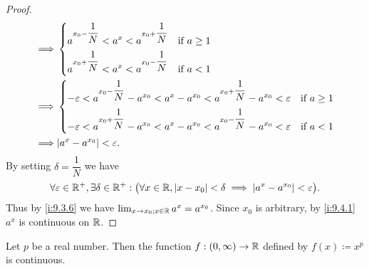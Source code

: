 \begin{proof}
\begin{align*}
    \implies & \begin{dcases}
                 a^{x_0 - \dfrac{1}{N}} < a^{x} < a^{x_0 + \dfrac{1}{N}} & \text{if } a \geq 1 \\
                 a^{x_0 + \dfrac{1}{N}} < a^{x} < a^{x_0 - \dfrac{1}{N}} & \text{if } a < 1
               \end{dcases}                                                          \\
    \implies & \begin{dcases}
                 -\varepsilon < a^{x_0 - \dfrac{1}{N}} - a^{x_0} < a^x - a^{x_0} < a^{x_0 + \dfrac{1}{N}} - a^{x_0} < \varepsilon & \text{if } a \geq 1 \\
                 -\varepsilon < a^{x_0 + \dfrac{1}{N}} - a^{x_0} < a^x - a^{x_0} < a^{x_0 - \dfrac{1}{N}} - a^{x_0} < \varepsilon & \text{if } a < 1
               \end{dcases} \\
    \implies & \abs{a^x - a^{x_0}} < \varepsilon.
  \end{align*}
  By setting \(\delta = \dfrac{1}{N}\) we have
  \[
    \forall \varepsilon \in \mathbb{R}^+, \exists \delta \in \mathbb{R}^+ : \big(\forall x \in \mathbb{R}, \left\lvert x - x_0\right\rvert < \delta \implies \left\lvert a^x - a^{x_0}\right\rvert < \varepsilon\big).
  \]
  Thus by \cref{i:9.3.6} we have \(\lim_{x \to x_0 ; x \in \mathbb{R}} a^x = a^{x_0}\).
  Since \(x_0\) is arbitrary, by \cref{i:9.4.1} \(a^x\) is continuous on \(\mathbb{R}\).
\end{proof}

\begin{prop}\label{i:9.4.11}
  Let \(p\) be a real number.
  Then the function \(f : (0, \infty) \to \mathbb{R}\) defined by \(f(x) \coloneqq x^p\) is continuous.
\end{prop}

